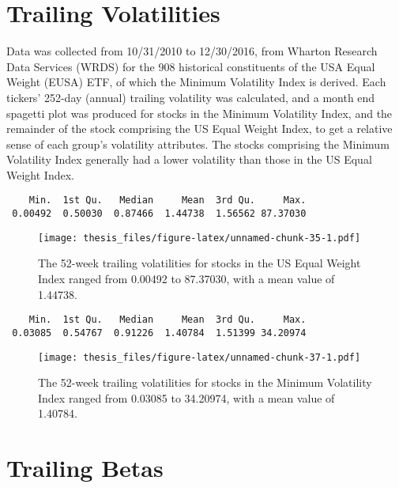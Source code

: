 \documentclass[12pt,twoside]{reedthesis}
\theoremstyle{definition}
\theoremstyle{definition}
\theoremstyle{definition}
\theoremstyle{remark}
\begin{document}
\section{Trailing Volatilities}\label{trailing-volatilities}

Data was collected from 10/31/2010 to 12/30/2016, from Wharton Research
Data Services (WRDS) for the 908 historical constituents of the USA
Equal Weight (EUSA) ETF, of which the Minimum Volatility Index is
derived. Each tickers' 252-day (annual) trailing volatility was
calculated, and a month end spagetti plot was produced for stocks in the
Minimum Volatility Index, and the remainder of the stock comprising the
US Equal Weight Index, to get a relative sense of each group's
volatility attributes. The stocks comprising the Minimum Volatility
Index generally had a lower volatility than those in the US Equal Weight
Index.
\begin{verbatim}
    Min.  1st Qu.   Median     Mean  3rd Qu.     Max. 
 0.00492  0.50030  0.87466  1.44738  1.56562 87.37030 
\end{verbatim}
\begin{figure}[htbp]
\centering
\texttt{[image: thesis\_files/figure-latex/unnamed-chunk-35-1.pdf]}
\caption{\label{fig:unnamed-chunk-35}The 52-week trailing volatilities for
stocks in the US Equal Weight Index ranged from 0.00492 to 87.37030,
with a mean value of 1.44738.}
\end{figure}
\begin{verbatim}
    Min.  1st Qu.   Median     Mean  3rd Qu.     Max. 
 0.03085  0.54767  0.91226  1.40784  1.51399 34.20974 
\end{verbatim}
\begin{figure}[htbp]
\centering
\texttt{[image: thesis\_files/figure-latex/unnamed-chunk-37-1.pdf]}
\caption{\label{fig:unnamed-chunk-37}The 52-week trailing volatilities for
stocks in the Minimum Volatility Index ranged from 0.03085 to 34.20974,
with a mean value of 1.40784.}
\end{figure}
\section{Trailing Betas}\label{trailing-betas}
\end{document}
